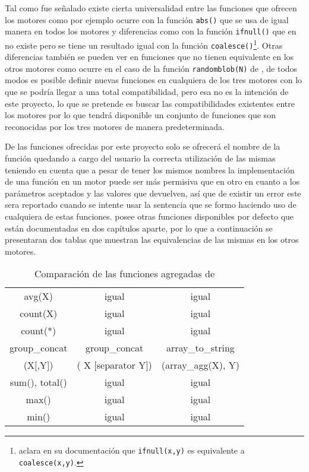 Tal como fue señalado existe cierta universalidad entre las funciones que ofrecen los motores como por ejemplo ocurre con la función \verb=abs()= que se usa de igual manera en todos los motores y diferencias como con la función \verb=ifnull()= que en \p no existe pero se tiene un resultado igual con la función \verb=coalesce()=\footnote{\s aclara en su documentación que \texttt{ifnull(x,y)} es equivalente a \texttt{coalesce(x,y)}.}. Otras diferencias también se pueden ver en funciones que no tienen equivalente en los otros motores como ocurre en el caso de la función \verb=randomblob(N)= de \s, de todos modos es posible definir nuevas funciones en cualquiera de los tres motores con lo que se podría llegar a una total compatibilidad, pero esa no es la intención de este proyecto, lo que se pretende es buscar las compatibilidades existentes entre los motores por lo que \jj tendrá disponible un conjunto de funciones que son reconocidas por los tres motores de manera predeterminada.

De las funciones ofrecidas por este proyecto solo se ofrecerá el nombre de la función quedando a cargo del usuario la correcta utilización de las mismas teniendo en cuenta que a pesar de tener los mismos nombres la implementación de una función en un motor puede ser más permisiva que en otro en cuanto a los parámetros aceptados y las valores que devuelven, así que de existir un error este sera reportado cuando se intente usar la sentencia que se formo haciendo uso de cualquiera de estas funciones. \s posee otras funciones disponibles por defecto que están documentadas en dos capítulos aparte, por lo que a continuación se presentaran dos tablas que muestran las equivalencias de las mismas en los otros motores.

\begin{table}[h]
\begin{center}
{
\selectfont
\begin{tabular}{|c|c|c|}
\hline 
\s & \m & \p \\ 
\hline 
avg(X) & igual & igual \\ 
\hline 
count(X) & igual & igual \\ 
\hline 
count(*) & igual & igual \\ 
\hline 
group\_concat & group\_concat & array\_to\_string \\ 
(X[,Y]) & ( X [separator Y]) & (array\_agg(X), Y) \\
\hline 
sum(), total() & igual & igual \\ 
\hline 
max() & igual & igual \\ 
\hline 
min() & igual & igual \\ 
\hline 
\end{tabular} 
}
\end{center}
\caption{Comparación de las funciones agregadas de \s}
\end{table}  

